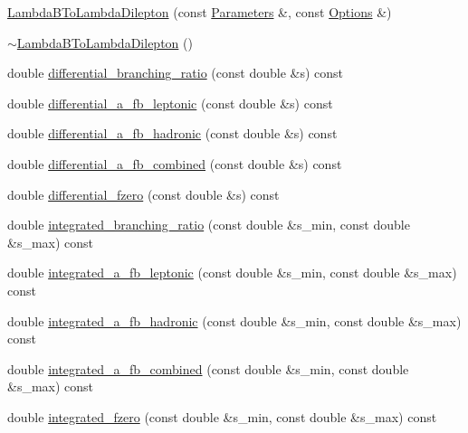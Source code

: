 \begin{DoxyCompactItemize}
\item 
\hyperlink{classeos_1_1LambdaBToLambdaDilepton_3_01LowRecoil_01_4_a53eff2dfb29006c924132c927443d895}{LambdaBToLambdaDilepton} (const \hyperlink{classeos_1_1Parameters}{Parameters} \&, const \hyperlink{classeos_1_1Options}{Options} \&)
\item 
\hyperlink{classeos_1_1LambdaBToLambdaDilepton_3_01LowRecoil_01_4_a71cb75b13d5959d2ffe97eefb56f6b4f}{$\sim$LambdaBToLambdaDilepton} ()
\item 
double \hyperlink{classeos_1_1LambdaBToLambdaDilepton_3_01LowRecoil_01_4_a5bf6fdb7a2e8d3e1279c418abf0bec04}{differential\_\-branching\_\-ratio} (const double \&s) const 
\item 
double \hyperlink{classeos_1_1LambdaBToLambdaDilepton_3_01LowRecoil_01_4_a9708551614c246de13905510d0c5bba2}{differential\_\-a\_\-fb\_\-leptonic} (const double \&s) const 
\item 
double \hyperlink{classeos_1_1LambdaBToLambdaDilepton_3_01LowRecoil_01_4_a51ba1bac1b04b03fa0281636845fe44b}{differential\_\-a\_\-fb\_\-hadronic} (const double \&s) const 
\item 
double \hyperlink{classeos_1_1LambdaBToLambdaDilepton_3_01LowRecoil_01_4_a9003b7c33f5afe5f0371ccd8574eb5fb}{differential\_\-a\_\-fb\_\-combined} (const double \&s) const 
\item 
double \hyperlink{classeos_1_1LambdaBToLambdaDilepton_3_01LowRecoil_01_4_afc326b18069eb60d56dd9579d23ee173}{differential\_\-fzero} (const double \&s) const 
\item 
double \hyperlink{classeos_1_1LambdaBToLambdaDilepton_3_01LowRecoil_01_4_a70e787fa5e6a92c323644b5f0a11206f}{integrated\_\-branching\_\-ratio} (const double \&s\_\-min, const double \&s\_\-max) const 
\item 
double \hyperlink{classeos_1_1LambdaBToLambdaDilepton_3_01LowRecoil_01_4_a1db208cebab7f98fc22b69bf3f6ab36f}{integrated\_\-a\_\-fb\_\-leptonic} (const double \&s\_\-min, const double \&s\_\-max) const 
\item 
double \hyperlink{classeos_1_1LambdaBToLambdaDilepton_3_01LowRecoil_01_4_a926d1ccf5ef2271a2deda27008f1e278}{integrated\_\-a\_\-fb\_\-hadronic} (const double \&s\_\-min, const double \&s\_\-max) const 
\item 
double \hyperlink{classeos_1_1LambdaBToLambdaDilepton_3_01LowRecoil_01_4_a2362225db8cae86eeb05394a5dd62e70}{integrated\_\-a\_\-fb\_\-combined} (const double \&s\_\-min, const double \&s\_\-max) const 
\item 
double \hyperlink{classeos_1_1LambdaBToLambdaDilepton_3_01LowRecoil_01_4_ad5cbe369b4f7131dec8928628222e37d}{integrated\_\-fzero} (const double \&s\_\-min, const double \&s\_\-max) const 
\end{DoxyCompactItemize}
